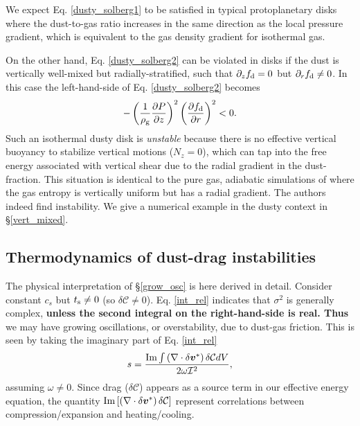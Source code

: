 We expect Eq. \ref{dusty_solberg1} to be satisfied in typical
protoplanetary disks where the dust-to-gas ratio increases in the same
direction as the local pressure gradient, which is equivalent to the
gas density gradient for isothermal gas. 

On the other hand, Eq. \ref{dusty_solberg2} can be violated in
disks if the dust is vertically well-mixed but radially-stratified,  
such that $\partial_zf_\mathrm{d} = 0$ but $\partial_rf_\mathrm{d}\neq0$. In this case the
left-hand-side of Eq. \ref{dusty_solberg2} becomes
\begin{align}
-\left(\frac{1}{\rho_\mathrm{g}}\frac{\partial P}{\partial
    z}\right)^2\left(\frac{\partial f_\mathrm{d}}{\partial r}\right)^2<0.
\end{align}
Such an isothermal dusty disk is \emph{unstable} because there is no
effective vertical buoyancy to stabilize vertical motions ($N_z=0$),
which can tap into the free energy associated with  
vertical shear due to the radial gradient in the dust-fraction. 
This situation is identical to the pure gas, adiabatic simulations of \cite{nelson13}
where the gas entropy is vertically uniform but has a radial
gradient. The authors indeed find instability. We give a numerical
example in the dusty context in \S\ref{vert_mixed}.   

\subsection{Thermodynamics of dust-drag instabilities}\label{dust_work}
The physical interpretation of \S\ref{grow_osc} is here derived in
detail. Consider constant $c_s$ but $t_\mathrm{s}\neq0$ (so $\delta\mathcal{C}
\neq 0$). Eq. \ref{int_rel} indicates that $\sigma^2$ is generally complex, {\bf unless
the second integral on the right-hand-side is real. Thus } 
we may have growing oscillations, or overstability, due to dust-gas
friction. This is seen by taking the imaginary part of
Eq. \ref{int_rel} 
\begin{align}
  s = \frac{\operatorname{Im}\int \left(\nabla\cdot\delta\bm{v}^*\right)\delta\mathcal{C}dV}{2\omega\mathcal{I}^2}, \label{thermal_instability}
\end{align} 
assuming $\omega\neq0$. %
Since drag ($\delta \mathcal{C}$) appears as a source term in our
effective energy equation, the quantity 
$\operatorname{Im}\left[\left(\nabla\cdot\delta\bm{v}^*\right)\delta\mathcal{C}\right]$
represent correlations between compression/expansion and  
heating/cooling.  

